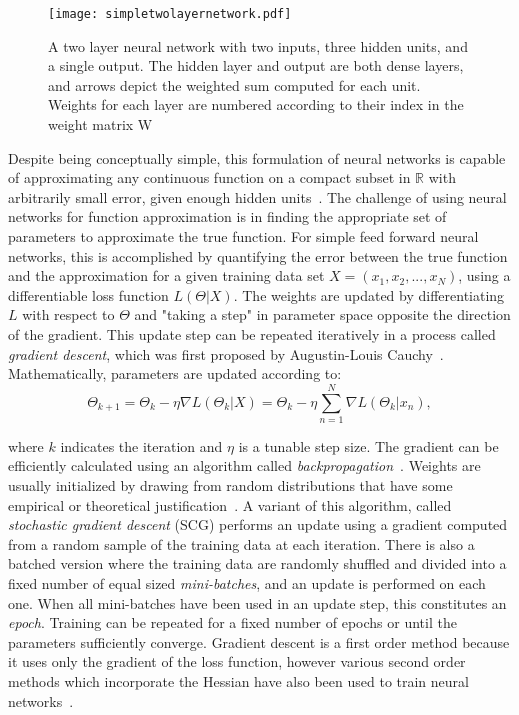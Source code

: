 \begin{figure}
	\centering
	\texttt{[image: simpletwolayernetwork.pdf]}
	\caption{A two layer neural network with two inputs, three hidden units, and a single output. The hidden layer and output are both dense layers, and arrows depict the weighted sum computed for each unit. Weights for each layer are numbered according to their index in the weight matrix W}
	\label{fig:twolayernetwork}
\end{figure}


Despite being conceptually simple, this formulation of neural networks is capable of approximating any continuous function on a compact subset in $\mathbb{R}$ with arbitrarily small error, given enough hidden units~\cite{cybenko1989}.
The challenge of using neural networks for function approximation is in finding the appropriate set of parameters to approximate the true function.
For simple feed forward neural networks, this is accomplished by quantifying the error between the true function and the approximation for a given training data set $X=(x_1, x_2, ..., x_N)$, using a differentiable loss function $L(\Theta | X)$. 
The weights are updated by differentiating $L$ with respect to $\Theta$ and "taking a step" in parameter space opposite the direction of the gradient. 
This update step can be repeated iteratively in a process called \textit{gradient descent}, which was first proposed by Augustin-Louis Cauchy~\cite{cauchy1847}.
Mathematically, parameters are updated according to:
\begin{equation}
\Theta_{k+1} = \Theta_k - \eta \nabla L(\Theta_k | X) = \Theta_k - \eta \sum_{n=1}^{N} \nabla L(\Theta_k | x_n),
\label{eq:batch_gd}
\end{equation}

\noindent
where $k$ indicates the iteration and $\eta$ is a tunable step size.
The gradient can be efficiently calculated using an algorithm called \emph{backpropagation}~\cite{rumelhart1988}.
Weights are usually initialized by drawing from random distributions that have some empirical or theoretical justification~\cite{glorot2010}.
A variant of this algorithm, called \textit{stochastic gradient descent} (SCG) performs an update using a gradient computed from a random sample of the training data at each iteration.
There is also a batched version where the training data are randomly shuffled and divided into a fixed number of equal sized \textit{mini-batches}, and an update is performed on each one. 
When all mini-batches have been used in an update step, this constitutes an \textit{epoch}.
Training can be repeated for a fixed number of epochs or until the parameters sufficiently converge.
Gradient descent is a first order method because it uses only the gradient of the loss function, however various second order methods which incorporate the Hessian have also been used to train neural networks~\cite{fletcher1964, polak1969, moller1993, marquardt1963}.


